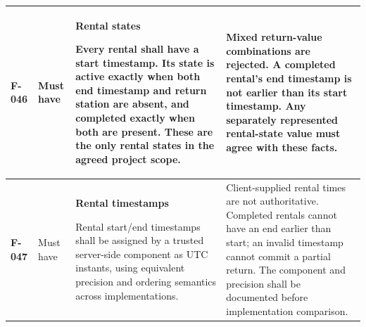 \documentclass[10pt,a4paper,landscape]{article}
\newcommand{\reqtitle}[1]{{\fontsize{11}{13}\selectfont\bfseries #1}\par\nobreak\vspace{2pt}\noindent}
\begin{document}
\begin{longtable}{|C{27mm}|C{25mm}|L{79mm}|L{111mm}|}
\textbf{F-046} & Must have & \reqtitle{Rental states}Every rental shall have a start timestamp. Its state is active exactly when both end timestamp and return station are absent, and completed exactly when both are present. These are the only rental states in the agreed project scope. & Mixed return-value combinations are rejected. A completed rental’s end timestamp is not earlier than its start timestamp. Any separately represented rental-state value must agree with these facts. \\\hline

\textbf{F-047} & Must have & \reqtitle{Rental timestamps}Rental start/end timestamps shall be assigned by a trusted server-side component as UTC instants, using equivalent precision and ordering semantics across implementations. & Client-supplied rental times are not authoritative. Completed rentals cannot have an end earlier than start; an invalid timestamp cannot commit a partial return. The component and precision shall be documented before implementation comparison. \\\hline
\end{longtable}
\endgroup

\end{document}
